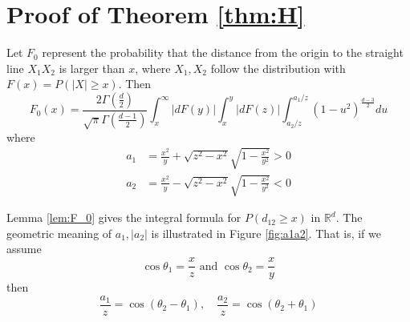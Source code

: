 \documentclass{aptpub}
\def\R{\mathbb{R}}
\begin{document}



\appendix

\section{Proof of Theorem \ref{thm:H}}\label{app:th}
\begin{lemma}\label{lem:F_0}
     Let $F_0$ represent the
probability that the distance from the origin to the straight line
$X_1X_2$ is larger than $x$, where $X_1, X_2$ follow the distribution with $F(x)=P(|X|\geq x)$.
Then 
\begin{equation}\label{eq:F_0_expression}
     F_0(x)=\frac{2\Gamma(\frac{d}{2})}
     {\sqrt{\pi}\Gamma(\frac{d-1}{2})}
     \int_x^{\infty} |dF(y)|
     \int_x^{y} |dF(z)| \int_{a_2/z}^{a_1 /z} (1-u^2)^{\frac{d-3}{2}}du
 \end{equation}
where
\begin{align}
     a_1 & =\frac{x^2}{y}+\sqrt{z^2-x^2}\sqrt{1-\frac{x^2}{y^2}} > 0
     \label{eq:a_1} \\
a_2 & =\frac{x^2}{y}-\sqrt{z^2-x^2}\sqrt{1-\frac{x^2}{y^2}} < 0
\label{eq:a_2}
\end{align}
\end{lemma}
Lemma \ref{lem:F_0} gives the integral formula for $P(d_{12}\geq x)$ in $\R^d$.
The geometric meaning of $a_1, |a_2|$ is illustrated in Figure
\ref{fig:a1a2}. That is, if we assume
\begin{equation}\label{eq:theta_1_theta_2}
     \cos\theta_1=\frac{x}{z}
     \textrm{ and } \cos\theta_2=\frac{x}{y} 
\end{equation}
then
\begin{equation}\label{eq:a_1_a_2}
     \frac{a_1}{z} = \cos(\theta_2 - \theta_1),
     \quad
     \frac{a_2}{z} = \cos(\theta_2+\theta_1)           
\end{equation}
\end{document}
